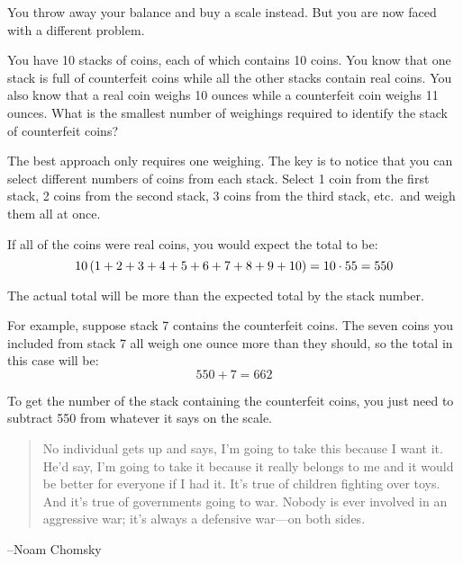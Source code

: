 \documentclass[letterpaper, landscape]{exam}
\begin{document}
\begin{questions}
\begin{solution}
        \end{solution}

      \question{}

        You throw away your balance and buy a scale instead.  But you are now faced with a different
        problem.  

        You have 10 stacks of coins, each of which contains 10 coins.  You know that one stack is full
        of counterfeit coins while all the other stacks contain real coins.  You also know that a real
        coin weighs 10 ounces while a counterfeit coin weighs 11 ounces.  What is the smallest number
        of weighings required to identify the stack of counterfeit coins?

        \begin{solution}

          The best approach only requires one weighing.  The key is to notice that you can select different numbers of
          coins from each stack.  Select 1 coin from the first stack, 2 coins from the second stack, 3 coins from the
          third stack, etc.\ and weigh them all at once.

          If all of the coins were real coins, you would expect the total to be: 
          \[ 
            10 \del{ 1 + 2 + 3 + 4 + 5 + 6 + 7 + 8 + 9 + 10 }  = 10 \cdot 55 = 550 
          \]

          The actual total will be more than the expected total by the stack number.  

          For example, suppose stack 7 contains the counterfeit coins.  The seven coins you included from
          stack 7 all weigh one ounce more than they should, so the total in this case will be: 
          \[ 
            550 + 7 = 662 
          \]

          To get the number of the stack containing the counterfeit coins, you just need to subtract 550
          from whatever it says on the scale.

        \end{solution}

  \end{questions}

  \ifprintanswers{}
  \else
      \vspace{6 cm}
      \begin{quote}
          \begin{em}
              No individual gets up and says, I'm going to take this because I want it. He'd say, I'm
              going to take it because it really belongs to me and it would be better for everyone if I
              had it. It's true of children fighting over toys. And it's true of governments going to war.
              Nobody is ever involved in an aggressive war; it's always a defensive war---on both sides.
          \end{em}
      \end{quote}
      \hspace{1 cm} --Noam Chomsky
  \fi
\end{document}
